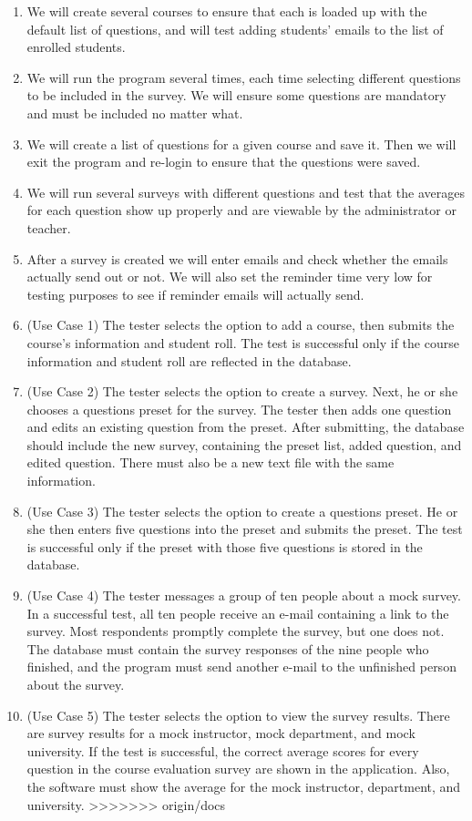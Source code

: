 \documentclass{article}
\begin{document}
\begin{enumerate}
  \item We will create several courses to ensure that each is loaded up with the default list of questions, and will test adding students' emails to the list of enrolled students.
  \item We will run the program several times, each time selecting different questions to be included in the survey. We will ensure some questions are mandatory and must be included no matter what.
  \item We will create a list of questions for a given course and save it. Then we will exit the program and re-login to ensure that the questions were saved.
  \item We will run several surveys with different questions and test that the averages for each question show up properly and are viewable by the administrator or teacher.
  \item After a survey is created we will enter emails and check whether the emails actually send out or not. We will also set the reminder time very low for testing purposes to see if reminder emails will actually send.

  \item (Use Case 1) The tester selects the option to add a course, then submits the course's information and student roll. The test is successful only if the course information and student roll are reflected in the database.
  \item (Use Case 2) The tester selects the option to create a survey. Next, he or she chooses a questions preset for the survey. The tester then adds one question and edits an existing question from the preset. After submitting, the database should include the new survey, containing the preset list, added question, and edited question. There must also be a new text file with the same information.
  \item (Use Case 3) The tester selects the option to create a questions preset. He or she then enters five questions into the preset and submits the preset. The test is successful only if the preset with those five questions is stored in the database.
  \item (Use Case 4) The tester messages a group of ten people about a mock survey. In a successful test, all ten people receive an e-mail containing a link to the survey. Most respondents promptly complete the survey, but one does not. The database must contain the survey responses of the nine people who finished, and the program must send another e-mail to the unfinished person about the survey.
  \item (Use Case 5) The tester selects the option to view the survey results. There are survey results for a mock instructor, mock department, and mock university. If the test is successful, the correct average scores for every question in the course evaluation survey are shown in the application. Also, the software must show the average for the mock instructor, department, and university.
>>>>>>> origin/docs
\end{enumerate}
\end{document}
